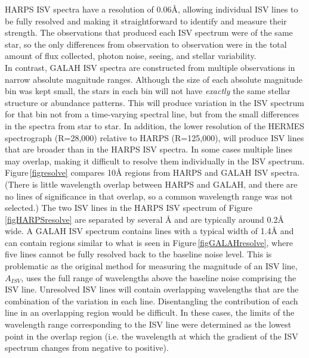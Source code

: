 HARPS ISV spectra have a resolution of 0.06\hbox{\AA}, allowing individual ISV lines to be fully resolved and making it straightforward to identify and measure their strength. The observations that produced each ISV spectrum were of the same star, so the only differences from observation to observation were in the total amount of flux collected, photon noise, seeing, and stellar variability.\\

In contrast, GALAH ISV spectra are constructed from multiple observations in narrow absolute magnitude ranges. Although the size of each absolute magnitude bin was kept small, the stars in each bin will not have {\em exactly} the same stellar structure or abundance patterns. This will produce variation in the ISV spectrum for that bin not from a time-varying spectral line, but from the small differences in the spectra from star to star. In addition, the lower resolution of the HERMES spectrograph (R=28,000) relative to HARPS (R=125,000), will produce ISV lines that are broader than in the HARPS ISV spectra. In some cases multiple lines may overlap, making it difficult to resolve them individually in the ISV spectrum.\\

Figure\,\ref{figresolve} compares 10\hbox{\AA} regions from HARPS and GALAH ISV spectra. (There is little wavelength overlap between HARPS and GALAH, and there are no lines of significance in that overlap, so a common wavelength range was not selected.) The two ISV lines in the HARPS ISV spectrum of Figure\,\ref{figHARPSresolve} are separated by several \hbox{\AA} and are typically around 0.2\hbox{\AA} wide. A GALAH ISV spectrum contains lines with a typical width of 1.4\hbox{\AA} and can contain regions similar to what is seen in Figure\,\ref{figGALAHresolve}, where five lines cannot be fully resolved back to the baseline noise level. This is problematic as the original method for measuring the magnitude of an ISV line, $A_{ISV}$, uses the full range of wavelengths above the baseline noise comprising the ISV line. Unresolved ISV lines will contain overlapping wavelengths that are the combination of the variation in each line. Disentangling the contribution of each line in an overlapping region would be difficult. In these cases, the limits of the wavelength range corresponding to the ISV line were determined as the lowest point in the overlap region (i.e. the wavelength at which the gradient of the ISV spectrum changes from negative to positive).\\

